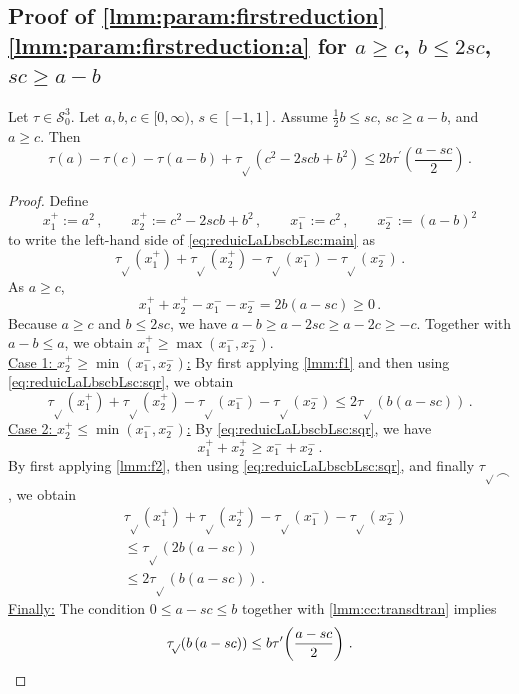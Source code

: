 \documentclass{article}
\newcommand{\lb}{\left(} %
\newcommand{\rb}{\right)} %
\newcommand{\br}[1]{\lb #1 \rb} %
\newcommand{\brOf}[1]{\!\br{#1}} %
\newcommand*{\mc}[1]{\mathcal{#1}}
\newcommand{\Rp}{[0, \infty)} %
\newcommand{\pr}{^\prime}
\newcommand{\equationFullstop}{\, .}
\newcommand{\eqfs}{\equationFullstop}
\newcommand{\equationComma}{\, ,}
\newcommand{\eqcm}{\equationComma}
\newcommand{\tran}{\tau}
\newcommand{\trans}{\tran_{\!\sqrt{}}}
\newcommand{\dtran}{\tran\pr}
\newcommand{\setccod}[1]{\mc S_0^{#1}}
\newcommand{\conc}{\smallfrown}
\begin{document}
\begin{appendix}
\subsection{Proof of \cref{lmm:param:firstreduction} \ref{lmm:param:firstreduction:a} for $a \geq c$, $b \leq 2sc$, $sc \geq a-b$}\label{ssec:reduicLaLbscbLsc}
%
%
%
\begin{lemma}\label{lmm:param:reduicLaLbscbLsc}
	Let $\tran\in\setccod3$.
	Let $a,b,c\in\Rp$, $s\in[-1,1]$.
	Assume $\frac12 b \leq sc$, $sc \geq a-b$, and $a\geq c$.
	Then
	\begin{equation}\label{eq:reduicLaLbscbLsc:main}
		\tran(a) - \tran(c) - \tran(a-b) + \trans(c^2 - 2 s c b + b^2) 
		\leq 
		2 b \dtran\brOf{\frac{a-sc}{2}}
		\eqfs
	\end{equation}
\end{lemma}
%
\begin{proof}
	Define
	\begin{equation*}
		x_1^+ := a^2\eqcm\qquad
		x_2^+ := c^2 - 2 s c b + b^2\eqcm\qquad
		x_1^- := c^2\eqcm\qquad
		x_2^- := (a-b)^2
	\end{equation*} 
	to write the left-hand side of \eqref{eq:reduicLaLbscbLsc:main} as
	\begin{equation*}
		\trans(x_1^+) + \trans(x_2^+) - \trans(x_1^-) - \trans(x_2^-)
		\eqfs
	\end{equation*}
	As $a\geq c$,
	\begin{equation}\label{eq:reduicLaLbscbLsc:sqr}
		x_1^+ + x_2^+ -  x_1^- - x_2^-  = 2 b \br{a - s c} \geq 0
		\eqfs
	\end{equation}
	Because $a \geq c$ and $b \leq 2sc$, we have $a-b \geq a-2sc \geq a-2c \geq -c$. Together with $a-b \leq a$, we obtain $x_1^+ \geq \max(x_1^-, x_2^-)$.\\
	\underline{Case 1:  $x_2^+ \geq \min(x_1^-, x_2^-)$:}
	By first applying \cref{lmm:f1} and then using \eqref{eq:reduicLaLbscbLsc:sqr}, we obtain
	\begin{equation*}
		\trans(x_1^+) + \trans(x_2^+) - \trans(x_1^-) - \trans(x_2^-)
		\leq 
		2 \trans\brOf{b \br{a - s c}}
		\eqfs
	\end{equation*}
	\underline{Case 2:   $x_2^+ \leq \min(x_1^-, x_2^-)$:}
	By \eqref{eq:reduicLaLbscbLsc:sqr}, we have
	\begin{equation}
		x_1^+ + x_2^+ \geq  x_1^- + x_2^-
		\eqfs
	\end{equation}
	By first applying \cref{lmm:f2}, then using \eqref{eq:reduicLaLbscbLsc:sqr}, and finally $\trans\conc$, we obtain
	\begin{align*}
		&\trans(x_1^+) + \trans(x_2^+) - \trans(x_1^-) - \trans(x_2^-)
		\\&\leq 
		\trans\brOf{2 b \br{a - s c}}
		\\&\leq 
		2\trans\brOf{b \br{a - s c}}
		\eqfs
	\end{align*}
	\underline{Finally:}
	The condition $0 \leq a-sc \leq b$ together with \cref{lmm:cc:transdtran} implies 
	\begin{equation*}
		\trans\brOf{b \br{a - s c}}
		\leq 
		b \dtran\brOf{\frac{a-sc}{2}}
		\eqfs
		\qedhere
	\end{equation*}
\end{proof}
%
%
%
%
%
%
%

\end{appendix}
\end{document}
